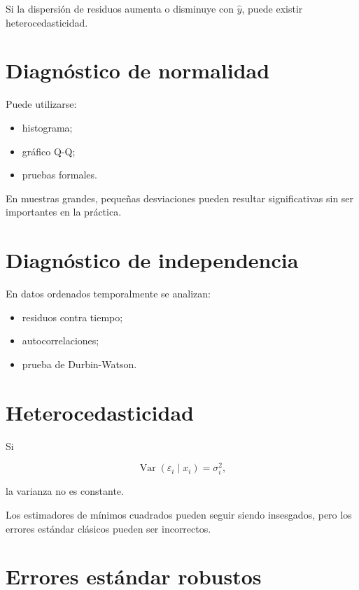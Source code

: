 \documentclass[
  spanish,
  11pt,
  letterpaper,
  DIV=11,
  numbers=noendperiod]{scrreprt}
\providecommand{\tightlist}{%
  \setlength{\itemsep}{0pt}\setlength{\parskip}{0pt}}
\theoremstyle{definition}
\theoremstyle{plain}
\theoremstyle{definition}
\theoremstyle{remark}
\begin{document}
Si la dispersión de residuos aumenta o disminuye con \(\widehat{y}\),
puede existir heterocedasticidad.

\section{Diagnóstico de normalidad}\label{diagnuxf3stico-de-normalidad}

Puede utilizarse:

\begin{itemize}
\tightlist
\item
  histograma;
\item
  gráfico Q-Q;
\item
  pruebas formales.
\end{itemize}

En muestras grandes, pequeñas desviaciones pueden resultar
significativas sin ser importantes en la práctica.

\section{Diagnóstico de
independencia}\label{diagnuxf3stico-de-independencia}

En datos ordenados temporalmente se analizan:

\begin{itemize}
\tightlist
\item
  residuos contra tiempo;
\item
  autocorrelaciones;
\item
  prueba de Durbin-Watson.
\end{itemize}

\section{Heterocedasticidad}\label{heterocedasticidad}

Si

\[
\operatorname{Var}(\varepsilon_i\mid x_i)
=
\sigma_i^2,
\]

la varianza no es constante.

Los estimadores de mínimos cuadrados pueden seguir siendo insesgados,
pero los errores estándar clásicos pueden ser incorrectos.

\section{Errores estándar robustos}\label{errores-estuxe1ndar-robustos}
\end{document}
